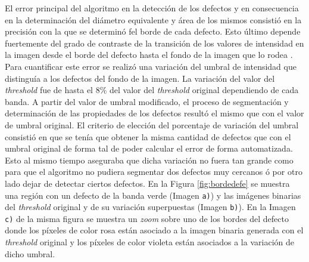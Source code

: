El error principal del algoritmo en la detección de los defectos y en consecuencia en la determinación del diámetro equivalente  y área de los mismos consistió en la precisión con la que se determinó fel borde de cada defecto. Esto último depende fuertemente del grado de contraste de la transición de los valores de intensidad en la imagen desde el borde del defecto hasta el fondo de la imagen que lo rodea \cite{quentin}. Para cuantificar este error se realizó una variación del umbral de intensidad que distinguía a los defectos del fondo de la imagen. La variación del valor del \textit{threshold} fue de hasta el 8\% del valor del \textit{threshold} original dependiendo de cada banda. A partir del valor de umbral modificado, el proceso de segmentación y determinación de las propiedades de los defectos resultó el mismo que con el valor de umbral original. El criterio de elección del porcentaje de variación del umbral consistió en que se tenía que obtener la misma cantidad de defectos que con el umbral original de forma tal de poder calcular el error de forma automatizada. Esto al mismo tiempo aseguraba que dicha variación no fuera tan grande como para que el algoritmo no pudiera segmentar dos defectos muy cercanos ó por otro lado dejar de detectar ciertos defectos. En la Figura \ref{fig:bordedefe} se muestra una región con un defecto de la banda verde (Imagen \texttt{a)}) y las imágenes binarias del \textit{threshold} original y de su variación superpuestas (Imagen \texttt{b)}). En la Imagen \texttt{c)} de la misma figura se muestra un \textit{zoom} sobre uno de los bordes del defecto donde los píxeles de color rosa están asociado a la imagen binaria generada con el \textit{threshold} original y los píxeles de color violeta están asociados a la variación de dicho umbral.
